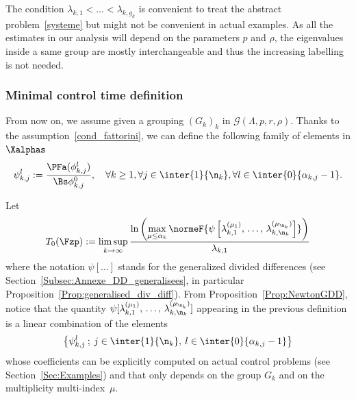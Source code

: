 \begin{rema}
The condition $\lambda_{k,1} < \dots < \lambda_{k,g_k}$ is convenient to treat the abstract problem~\eqref{systeme} but might not be convenient in actual examples. As all the estimates in our analysis will depend on the parameters $p$ and $\rho$, the eigenvalues inside a same group are mostly interchangeable and thus the increasing labelling is not needed.
\end{rema}


\subsubsection{Minimal control time definition}

From now on, we assume given a grouping $(G_k)_k$ in $\mathcal{G}(\Lambda,p,r,\rho)$. Thanks to the assumption~\eqref{cond_fattorini}, we can define the following family of elements in $\Xalphas$
\begin{equation}\label{Def_Psik}
\psi_{k,j}^l := \frac{\PFa(\phi_{k,j}^l)}{\Bs \phi_{k,j}^0}, \quad \forall k\geq 1, \forall j\in \inter{1}{\n_k}, \forall l \in \inter{0}{\alpha_{k,j}-1}.
\end{equation}



Let
\begin{equation}\label{Def:T0_DDgeneralisees}
T_0(\Fzp) := \limsup_{k\to \infty} \frac{\ln \left(\max \limits_{\mu\leq \alpha_k} \normeF{\psi\left[\lambda_{k,1}^{(\mu_1)},\,\dotsc,\,\lambda_{k,\n_k}^{(\mu_{\n_k})}\right] } \right)}{\lambda_{k,1}}
\end{equation}
where the notation $\psi[\dotsc]$ stands for the generalized divided differences (see Section~\ref{Subsec:Annexe_DD_generalisees}, in particular Proposition~\ref{Prop:generalised_div_diff}). From Proposition~\ref{Prop:NewtonGDD}, notice that the quantity $\psi[\lambda_{k,1}^{(\mu_1)},\,\dotsc,\,\lambda_{k,\n_k}^{(\mu_{\n_k})}]$ appearing in the previous definition is a linear combination of the elements
\[
\left\{ \psi_{k,j}^l \: ; \: j \in \inter{1}{\n_k}, \: l \in \inter{0}{\alpha_{k,j}-1} \right\}
\]
whose coefficients can be explicitly computed on actual control problems (see Section~\ref{Sec:Examples}) and that only depends on the group $G_k$ and on the multiplicity multi-index~$\mu$.

